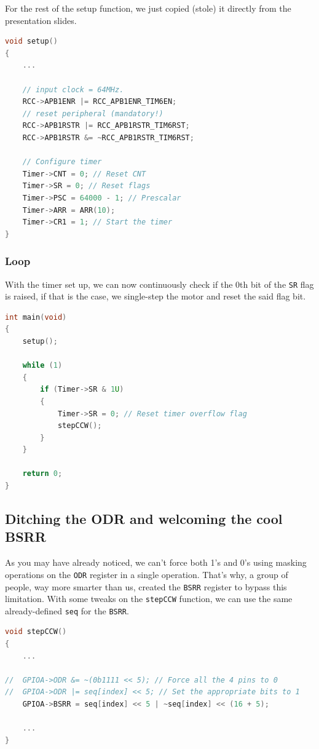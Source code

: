 \documentclass{article}
\begin{document}
For the rest of the setup function, we just copied (stole) it directly from the presentation slides.

\begin{lstlisting}[language=C++, caption={Timer setup function}]
void setup()
{
    ...

    // input clock = 64MHz.
    RCC->APB1ENR |= RCC_APB1ENR_TIM6EN;
    // reset peripheral (mandatory!)
    RCC->APB1RSTR |= RCC_APB1RSTR_TIM6RST;
    RCC->APB1RSTR &= ~RCC_APB1RSTR_TIM6RST;

    // Configure timer
    Timer->CNT = 0; // Reset CNT
    Timer->SR = 0; // Reset flags
    Timer->PSC = 64000 - 1; // Prescalar
    Timer->ARR = ARR(10);
    Timer->CR1 = 1; // Start the timer
}
\end{lstlisting}

\subsubsection{Loop}

With the timer set up, we can now continuously check if the 0th bit of the \verb|SR| flag is raised, if that is the case, we single-step the motor and reset the said flag bit.

\begin{lstlisting}[language=C++, caption={10HZ Counter-clockwise stepping loop}]
int main(void)
{
    setup();
    
    while (1)
    {
        if (Timer->SR & 1U)
        {
            Timer->SR = 0; // Reset timer overflow flag
            stepCCW();
        }
    }

    return 0;
}
\end{lstlisting}

\subsection{Ditching the ODR and welcoming the cool BSRR}

As you may have already noticed, we can't force both 1's and 0's using masking operations on the \verb|ODR| register in a single operation. That's why, a group of people, way more smarter than us, created the \verb|BSRR| register to bypass this limitation.
With some tweaks on the \verb|stepCCW| function, we can use the same already-defined \verb|seq| for the \verb|BSRR|.

\begin{lstlisting}[language=C++, caption={Migration from ODR to BSRR}]
void stepCCW()
{
    ...

//  GPIOA->ODR &= ~(0b1111 << 5); // Force all the 4 pins to 0
//  GPIOA->ODR |= seq[index] << 5; // Set the appropriate bits to 1  
    GPIOA->BSRR = seq[index] << 5 | ~seq[index] << (16 + 5);
        
    ...
}
\end{lstlisting}
\end{document}
